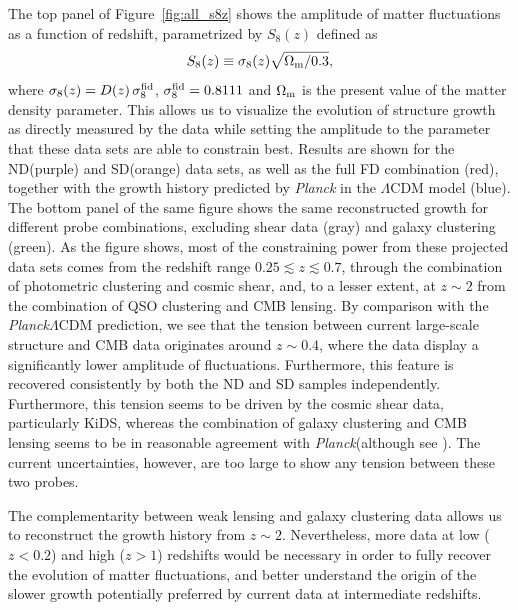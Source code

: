 \documentclass[a4paper,11pt]{article}
\newcommand{\Om}{\Omega_{\rm m}}
\newcommand{\lcdm}{$\Lambda$CDM\xspace}
\newcommand{\kids}{KiDS\xspace}
\newcommand{\planck}{{\sl Planck}\xspace}
\newcommand{\northd}{ND\xspace}
\newcommand{\southd}{SD\xspace}
\newcommand{\alld}{FD\xspace}
\begin{document}
      The top panel of Figure~\ref{fig:all_s8z} shows the amplitude of matter fluctuations as a function of redshift, parametrized by $S_8(z)$ defined as
      \begin{equation}
        S_8(z)\equiv\sigma_8(z)\sqrt{\Om/0.3},
      \end{equation}
      where $\sigma_8(z)=D(z)\,\sigma_8^{\rm fid}$, $\sigma_8^{\rm fid}=0.8111$ and $\Om$ is the present value of the matter density parameter. This allows us to visualize the evolution of structure growth as directly measured by the data while setting the amplitude to the parameter that these data sets are able to constrain best. Results are shown for the \northd (purple) and \southd (orange) data sets, as well as the full \alld combination (red), together with the growth history predicted by \planck in the \lcdm model (blue). The bottom panel of the same figure shows the same reconstructed growth for different probe combinations, excluding shear data (gray) and galaxy clustering (green). As the figure shows, most of the constraining power from these projected data sets comes from the redshift range $0.25\lesssim z\lesssim 0.7$, through the combination of photometric clustering and cosmic shear, and, to a lesser extent, at $z\sim2$ from the combination of QSO clustering and CMB lensing. By comparison with the \planck \lcdm prediction, we see that the tension between current large-scale structure and CMB data originates around $z\sim0.4$, where the data display a significantly lower amplitude of fluctuations. Furthermore, this feature is recovered consistently by both the \northd and \southd samples independently. Furthermore, this tension seems to be driven by the cosmic shear data, particularly \kids, whereas the combination of galaxy clustering and CMB lensing seems to be in reasonable agreement with \planck (although see \cite{2105.03421}). The current uncertainties, however, are too large to show any tension between these two probes.
      
      The complementarity between weak lensing and galaxy clustering data allows us to reconstruct the growth history from $z\sim2$. Nevertheless, more data at low ($z<0.2$) and high ($z>1$) redshifts would be necessary in order to fully recover the evolution of matter fluctuations, and better understand the origin of the slower growth potentially preferred by current data at intermediate redshifts.
\end{document}
